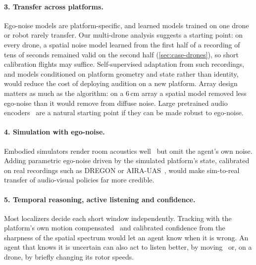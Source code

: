 \paragraph{3. Transfer across platforms.}
Ego-noise models are platform-specific, and learned models trained on one drone or robot rarely transfer.
Our multi-drone analysis suggests a starting point: on every drone, a spatial noise model learned from the first half of a recording of tens of seconds remained valid on the second half (\cref{sec:case-drones}), so short calibration flights may suffice.
Self-supervised adaptation from such recordings, and models conditioned on platform geometry and state rather than identity, would reduce the cost of deploying audition on a new platform.
Array design matters as much as the algorithm: on a 6\,cm array a spatial model removed less ego-noise than it would remove from diffuse noise.
Large pretrained audio encoders~\cite{kong2020panns,gong2021ast,chen2023beats} are a natural starting point if they can be made robust to ego-noise.

\paragraph{4. Simulation with ego-noise.}
Embodied simulators render room acoustics well~\cite{chen2022soundspaces2,gao2023sonicverse,luo2022naf} but omit the agent's own noise.
Adding parametric ego-noise driven by the simulated platform's state, calibrated on real recordings such as DREGON or AIRA-UAS~\cite{strauss2018dregon,ruizespitia2018aira}, would make sim-to-real transfer of audio-visual policies far more credible.

\paragraph{5. Temporal reasoning, active listening and confidence.}
Most localizers decide each short window independently.
Tracking with the platform's own motion compensated~\cite{valin2007tracking,evers2018slam,evers2020locata} and calibrated confidence from the sharpness of the spatial spectrum would let an agent know when it is wrong.
An agent that knows it is uncertain can also act to listen better, by moving~\cite{nakadai2000active,majumder2021move2hear} or, on a drone, by briefly changing its rotor speeds.

